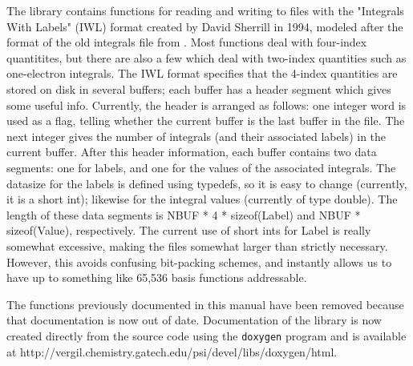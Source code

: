 The library  contains functions for reading and
writing to files with the "Integrals With Labels" (IWL) format created
by David Sherrill in 1994, modeled after the format of the old
integrals file from \PSItwo.  Most functions deal with four-index
quantitites, but there are also a few which deal with two-index
quantities such as one-electron integrals.  The IWL format specifies
that the 4-index quantities are stored on disk in several buffers;
each buffer has a header segment which gives some useful info.
Currently, the header is arranged as follows: one integer word is used
as a flag, telling whether the current buffer is the last buffer in
the file.  The next integer gives the number of integrals (and their
associated labels) in the current buffer.  After this header
information, each buffer contains two data segments: one for labels,
and one for the values of the associated integrals.  The datasize for
the labels is defined using typedefs, so it is easy to change
(currently, it is a short int); likewise for the integral values
(currently of type double).  The length of these data segments is NBUF
* 4 * sizeof(Label) and NBUF * sizeof(Value), respectively.  The
current use of short ints for Label is really somewhat excessive,
making the files somewhat larger than strictly necessary.  However,
this avoids confusing bit-packing schemes, and instantly allows us to
have up to something like 65,536 basis functions addressable.

The functions previously documented in this manual have been removed
because that documentation is now out of date.  Documentation of the
library is now created directly from the source code using the 
{\tt doxygen} program and is available at
{http://vergil.chemistry.gatech.edu/psi/devel/libs/doxygen/html}.

